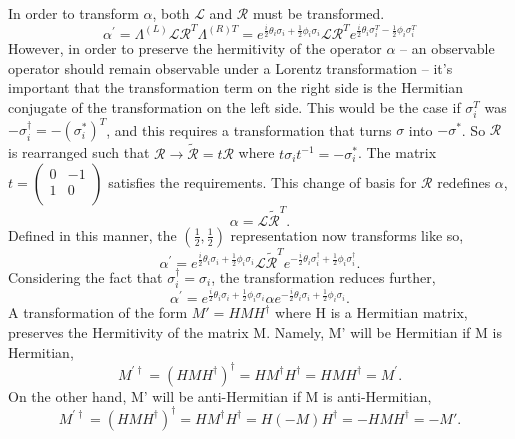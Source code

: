 \documentclass[12pt]{article}
\begin{document}
In order to transform $\alpha$, both $\mathcal{L}$ and $\mathcal{R}$ must be transformed.
\begin{equation}
\alpha^{'} = \Lambda^{(L)} \mathcal{L} \mathcal{R}^T \Lambda^{(R)T} 
 = e^{\frac{i}{2}\theta_i \sigma_i + \frac{1}{2}\phi_i \sigma_i} \mathcal{L} \mathcal{R}^T e^{\frac{i}{2}\theta_i \sigma_i^T - \frac{1}{2}\phi_i \sigma_i^T} 
\end{equation}
However, in order to preserve the hermitivity of the operator $\alpha$ -- an observable operator should remain observable under a Lorentz transformation -- it's important that the transformation term on the right side is the Hermitian conjugate of the transformation on the left side. This would be the case if $\sigma_i^T$ was $-\sigma_i^{\dagger} = -(\sigma_i^{*})^{T}$, and this requires a transformation that turns $\sigma$ into $-\sigma^{*}$. So $\mathcal{R}$ is rearranged such that $\mathcal{R} \rightarrow \tilde{\mathcal{R}} = t\mathcal{R}$ where $t\sigma_i t^{-1} = -\sigma_i^{*}$. The matrix $t = \left( \begin{smallmatrix} 0 & -1 \\ 1 & 0 \\ \end{smallmatrix} \right)$ satisfies the requirements. This change of basis for $\mathcal{R}$ redefines $\alpha$,
\begin{equation}
\alpha = \mathcal{L}\tilde{\mathcal{R}}^T.
\end{equation}
Defined in this manner, the $(\frac{1}{2}, \frac{1}{2})$ representation now transforms like so,
\begin{equation}
\alpha^{'} = e^{\frac{i}{2}\theta_i \sigma_i + \frac{1}{2}\phi_i \sigma_i} 
\mathcal{L}\tilde{\mathcal{R}}^T e^{-\frac{i}{2}\theta_i \sigma_i^\dagger + \frac{1}{2}\phi_i \sigma_i^\dagger}.
\end{equation}
Considering the fact that $\sigma_i^\dagger = \sigma_i$, the transformation reduces further,
\begin{equation}
\alpha^{'} = e^{\frac{i}{2}\theta_i \sigma_i + \frac{1}{2}\phi_i \sigma_i} 
\alpha e^{-\frac{i}{2}\theta_i \sigma_i + \frac{1}{2}\phi_i \sigma_i}.
\end{equation}
A transformation of the form $M' = HMH^\dagger$ where H is a Hermitian matrix, preserves the Hermitivity of the matrix M. Namely, M' will be Hermitian if M is Hermitian, 
\begin{equation}
M^{'\dagger} = (HMH^\dagger)^\dagger = HM^\dagger H^\dagger = HMH^\dagger = M^{'}.
\end{equation}
On the other hand, M' will be anti-Hermitian if M is anti-Hermitian,
\begin{equation}
M^{'\dagger} = (HMH^\dagger)^\dagger = HM^\dagger H^\dagger = H(-M)H^\dagger = -HMH^\dagger = -M'.
\end{equation}
\end{document}
